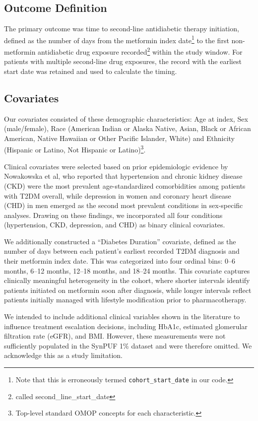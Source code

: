 \documentclass[twoside,11pt]{article}
\begin{document}
\subsection*{Outcome Definition}

The primary outcome was time to second-line antidiabetic therapy initiation, defined as the number of days from the metformin index date\footnote{Note that this is erroneously termed \texttt{cohort\_start\_date} in our code.} to the first non-metformin antidiabetic drug exposure recorded\footnote{called second\_line\_start\_date} within the study window. For patients with multiple second-line drug exposures, the record with the earliest start date was retained and used to calculate the timing.

\subsection*{Covariates}

Our covariates consisted of these demographic characteristics: Age at index, Sex (male/female), Race (American Indian or Alaska Native, Asian, Black or African American, Native Hawaiian or Other Pacific Islander, White) and Ethnicity (Hispanic or Latino, Not Hispanic or Latino)\footnote{Top-level standard OMOP concepts for each characteristic.}.

Clinical covariates were selected based on prior epidemiologic evidence by Nowakowska et al\cite{nowakowska2019}, who reported that hypertension and chronic kidney disease (CKD) were the most prevalent age-standardized comorbidities among patients with T2DM overall, while depression in women and coronary heart disease (CHD) in men emerged as the second most prevalent conditions in sex-specific analyses. Drawing on these findings, we incorporated all four conditions (hypertension, CKD, depression, and CHD) as binary clinical covariates.

We additionally constructed a ``Diabetes Duration'' covariate, defined as the number of days between each patient's earliest recorded T2DM diagnosis and their metformin index date. This was categorized into four ordinal bins: 0--6 months, 6--12 months, 12--18 months, and 18--24 months. This covariate captures clinically meaningful heterogeneity in the cohort, where shorter intervals identify patients initiated on metformin soon after diagnosis, while longer intervals reflect patients initially managed with lifestyle modification prior to pharmacotherapy.

We intended to include additional clinical variables shown in the literature to influence treatment escalation decisions, including HbA1c, estimated glomerular filtration rate (eGFR), and BMI. However, these measurements were not sufficiently populated in the SynPUF 1\% dataset and were therefore omitted. We acknowledge this as a study limitation.
\end{document}
